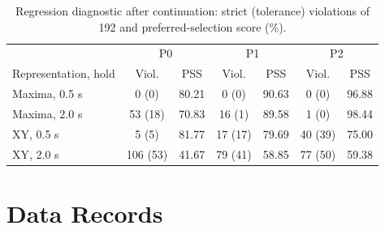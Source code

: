 \documentclass[10pt]{article}
\begin{document}
\begin{table}[h]
\centering\footnotesize
\caption{Regression diagnostic after continuation: strict (tolerance) violations of 192 and preferred-selection score (\%).}
\label{tab:sup-regression}
\begin{tabular}{lcccccc}
\toprule
& \multicolumn{2}{c}{P0} & \multicolumn{2}{c}{P1} & \multicolumn{2}{c}{P2}\\
Representation, hold & Viol. & PSS & Viol. & PSS & Viol. & PSS\\
\midrule
Maxima, 0.5 s & 0 (0) & 80.21 & 0 (0) & 90.63 & 0 (0) & 96.88\\
Maxima, 2.0 s & 53 (18) & 70.83 & 16 (1) & 89.58 & 1 (0) & 98.44\\
XY, 0.5 s & 5 (5) & 81.77 & 17 (17) & 79.69 & 40 (39) & 75.00\\
XY, 2.0 s & 106 (53) & 41.67 & 79 (41) & 58.85 & 77 (50) & 59.38\\
\bottomrule
\end{tabular}
\end{table}

\section{Data Records}\label{sup:records}
\end{document}
